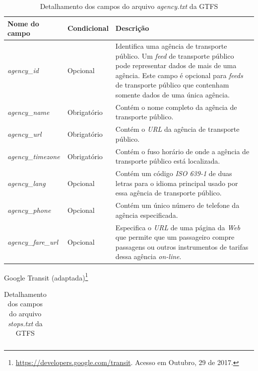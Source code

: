 \documentclass[
	12pt,				%
	oneside,			%
	a4paper,			%
	english,			%
	brazil				%
	]{abntex2ppgsi}
\begin{document}
\begin{apendicesenv}
\begin{table}[!htb]
\centering
  \caption{Detalhamento dos campos do arquivo \textit{agency.txt} da GTFS}
      \label{tab:gtfsAgency}
\begin{tabular}{>{\centering\arraybackslash}m{3.5cm} | >{\centering}m{3cm} | >{\centering\arraybackslash}m{8cm}}
\hline
\textbf{Nome do campo} & \textbf{Condicional} & \textbf{Descrição} \\
\hline
\textit{agency\_id} & Opcional & Identifica uma agência de transporte público. Um \textit{feed} de transporte público pode representar dados de mais de uma agência. Este campo é opcional para \textit{feeds} de transporte público que contenham somente dados de uma única agência. \\
\hline
\textit{agency\_name} & Obrigatório & Contém o nome completo da agência de transporte público. \\
\hline
\textit{agency\_url} & Obrigatório & Contém o \textit{URL} da agência de transporte público. \\
\hline
\textit{agency\_timezone} & Obrigatório & Contém o fuso horário de onde a agência de transporte público está localizada. \\
\hline
\textit{agency\_lang} & Opcional & Contém um código \textit{ISO 639-1} de duas letras para o idioma principal usado por essa agência de transporte público. \\
\hline
\textit{agency\_phone} & Opcional & Contém um único número de telefone da agência especificada. \\
\hline
\textit{agency\_fare\_url} & Opcional & Especifica o \textit{URL} de uma página da \textit{Web} que permite que um passageiro compre passagens ou outros instrumentos de tarifas dessa agência \textit{on-line}. \\
\hline
\end{tabular}
\end{table}
\vspace{-\baselineskip}
 Google Transit (adaptada)\footnote{\label{gtfsFields}\url{https://developers.google.com/transit}. Acesso em Outubro, 29 de 2017.}

\clearpage

\begin{longtable}[!htb]{>{\centering\arraybackslash}m{3.8cm} | >{\centering}m{2.5cm} | >{\centering\arraybackslash}m{8.5cm}}
  \caption{Detalhamento dos campos do arquivo \textit{stops.txt} da GTFS}
      \label{tab:gtfsStops} \\


\end{longtable}
\end{apendicesenv}
\end{document}
